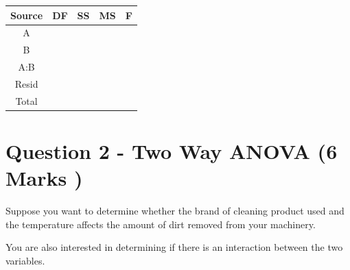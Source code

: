 \documentclass[a4paper,12pt]{article}
\begin{document}
{
	\LARGE
	\begin{center}
		\begin{center}
			\begin{tabular}{|c|c|c|c|c|}\hline
				Source & DF & SS & MS & F \\ \hline
				A  & \phantom{makespace}  & \phantom{makespace} & \phantom{makespace} & \phantom{makespace} \\ \hline
				B  &\phantom{makespace} & \phantom{makespace}  & \phantom{makespace}& \phantom{makespace} \\ \hline
				A:B  & \phantom{makespace}& \phantom{makespace} & \phantom{makespace} & \phantom{makespace} \\ \hline
				Resid & \phantom{makespace}& \phantom{makespace} & \phantom{makespace} & \\ \hline \hline
				Total & \phantom{makespace}&\phantom{makespace}  & \phantom{spa} & \\  \hline
			\end{tabular} 
		\end{center}
	\end{center}
}

	\section*{Question 2 - Two Way ANOVA (6 Marks )}
	\noindent Suppose you want to determine whether the brand of cleaning product used and the temperature affects the amount of dirt removed from your machinery. 
	
	\noindent You are also interested in determining if there is an interaction between the two variables.
	
\end{document}
